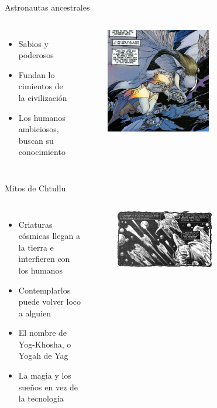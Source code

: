 \begin{frame}{Astronautas ancestrales}
\begin{columns}
 \begin{itemize}
    \item Sabios y poderosos
    \item Fundan lo cimientos de la civilización
    \item Los humanos ambiciosos, buscan su conocimiento
 \end{itemize}
    \begin{figure}[htb]
      \centering
      \includegraphics[width=0.6\textwidth]{img/tropes/astronautas}
    \end{figure}
  \end{columns}
\end{frame}
\note{

}

\begin{frame}{Mitos de Chtullu}
\begin{columns}
 \begin{itemize}
    \item Criaturas cósmicas llegan a la tierra e interfieren con los humanos
    \item Contemplarlos puede volver loco a alguien
    \item El nombre de Yog-Khosha, o Yogah de Yag
    \item La magia y los sueños en vez de la tecnología
 \end{itemize}
    \begin{figure}[htb]
      \centering
      \includegraphics[width=0.6\textwidth]{img/tropes/mitos}
    \end{figure}
  \end{columns}
\end{frame}
\note{

}

